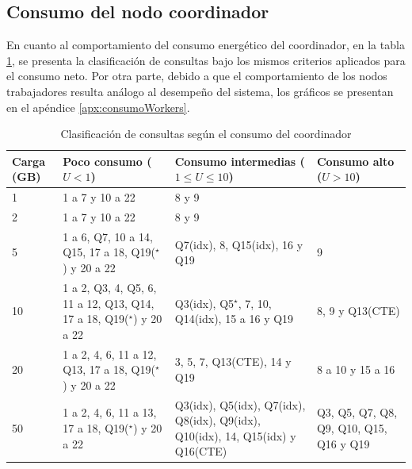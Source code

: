 \documentclass[12pt, letter paper]{report}
\begin{document}

      \subsection{Consumo del nodo coordinador} %
      \label{sub:consumo_del_nodo_coordinador}
        En cuanto al comportamiento del consumo energético del coordinador, en
        la tabla \ref{tab:consultasCoord}, se presenta la clasificación de
        consultas bajo los mismos criterios aplicados para el consumo neto. Por
        otra parte, debido a que el comportamiento de los nodos trabajadores 
        resulta análogo al desempeño del sistema, los gráficos se presentan en
        el apéndice \ref{apx:consumoWorkers}.

        \begin{table}[H]
          \caption{Clasificación de consultas según el consumo del coordinador}
          \begin{tabular}{| p{1cm} | p{6.25cm} | p{5.5cm} | p{3cm} |}
            \hline Carga (GB) %
              &                          Poco consumo ($U < 1$)                          &                     Consumo intermedias ($1 \le U \le 10$)                     &         Consumo alto ($U > 10$)         \\ \hline
            1 &                              1 a 7 y 10 a 22                             &                                      8 y 9                                     &                                         \\ \hline
            2 &                              1 a 7 y 10 a 22                             &                                      8 y 9                                     &                                         \\ \hline
            5 &        1 a 6, Q7, 10 a 14, Q15, 17 a 18, Q19($^\star$) y 20 a 22         &                         Q7(idx), 8, Q15(idx), 16 y Q19                         &                    9                    \\ \hline
           10 & 1 a 2, Q3, 4, Q5, 6, 11 a 12, Q13, Q14, 17 a 18, Q19($^\star$) y 20 a 22 &               Q3(idx), Q5$^\star$, 7, 10, Q14(idx), 15 a 16 y Q19              &              8, 9 y Q13(CTE)            \\ \hline
           20 &        1 a 2, 4, 6, 11 a 12, Q13, 17 a 18, Q19($^\star$) y 20 a 22       &                           3, 5, 7, Q13(CTE), 14 y Q19                          &             8 a 10 y 15 a 16            \\ \hline
           50 &          1 a 2, 4, 6, 11 a 13, 17 a 18, Q19($^\star$) y 20 a 22          & Q3(idx), Q5(idx), Q7(idx), Q8(idx), Q9(idx), Q10(idx), 14, Q15(idx) y Q16(CTE) & Q3, Q5, Q7, Q8, Q9, Q10, Q15, Q16 y Q19 \\ \hline
          \end{tabular}
          \label{tab:consultasCoord}
        \end{table}
\end{document}
